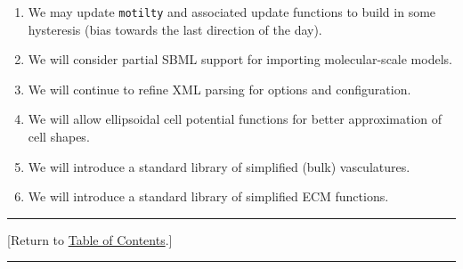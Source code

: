 \documentclass[12pt]{article}
\renewcommand{\v}{\verb}
\newcommand{\blue}[1]{\textcolor{blue}{#1}}
\newcommand{\DONE}{}%
\newcommand{\TOClink}{\begin{center}\hrule\vskip-10pt\phantom{.}\hfill[Return to \hyperlink{TOC}{Table of Contents}.]\hfill\phantom{.}\vskip3pt\hrule\end{center}}
\begin{document}
\begin{enumerate}
\item 
We may update \v|motilty| and associated update functions to 
build in some hysteresis (bias towards the last direction of the day).

\item 
We will consider partial SBML support for importing molecular-scale models. 

\item 
We will continue to refine XML parsing for options and configuration. 

\item 
We will allow ellipsoidal cell potential functions for better approximation of cell shapes. 

\item 
We will introduce  a standard library of simplified (bulk) vasculatures. 

\item 
We will introduce a standard library of simplified ECM functions. 

\end{enumerate}

\TOClink 






\end{document}
